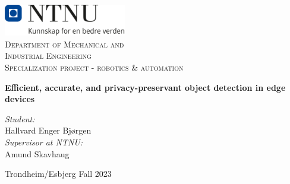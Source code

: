 \begin{titlepage}
\vbox{ }
\vbox{ }
\begin{center}
\includegraphics[width=0.40\textwidth]{Images/NTNU_logo.png}\\[1cm]
\textsc{\LARGE Department of Mechanical and  }\\[0.3cm]
\textsc{\LARGE Industrial Engineering}\\[1.5cm]
\textsc{\Large Specialization project - robotics \& automation}\\[0.5cm]
\vbox{ }

{ \huge \bfseries Efficient, accurate, and privacy-preservant object detection in edge devices}
\\[2.5cm] 

\large


\emph{Student:}\\
Hallvard Enger Bjørgen\\
\vspace{1cm}
\emph{Supervisor at NTNU:}\\
Amund Skavhaug
\vfill

{\large Trondheim/Esbjerg Fall 2023}
\end{center}
\end{titlepage}